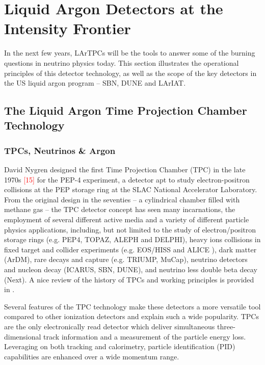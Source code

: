 \chapter{Liquid Argon Detectors at the Intensity Frontier}\label{ch:2}
In the next few years, LArTPCs will  be the tools to answer some of the burning questions in neutrino physics today.  This section illustrates the operational principles of this detector technology, as well as the scope of the key detectors in the US liquid argon program -- SBN, DUNE and LArIAT.


\section{The Liquid Argon Time Projection Chamber Technology}

\subsection{TPCs, Neutrinos \& Argon}
David Nygren designed the first Time Projection Chamber (TPC) in the late 1970s \textcolor{red}{[15]} for the  PEP-4 experiment, a detector  apt to study electron-positron collisions at the PEP storage ring at the SLAC National Accelerator Laboratory.
From the original design  in the seventies -- a cylindrical chamber filled with methane gas -- the TPC detector concept has seen many incarnations, the employment of several different active media and a variety of different particle physics applications, including, but not limited to the study of electron/positron storage rings (e.g. PEP4, TOPAZ, ALEPH and DELPHI), heavy ions collisions in fixed target and collider experiments (e.g. EOS/HISS and ALICE ), dark matter (ArDM), rare decays and capture (e.g. TRIUMP, MuCap),  neutrino detectors and nucleon decay (ICARUS, SBN, DUNE), and neutrino less double beta decay (Next). A nice review of the history of TPCs and working principles is provided in \cite{0034-4885-73-11-116201}.

Several features of the TPC technology make these detectors a more versatile tool compared to other ionization detectors and explain such a wide popularity. TPCs are the only electronically read detector which deliver simultaneous  three-dimensional track information and a measurement of the particle energy loss. Leveraging on both tracking and calorimetry,  particle identification (PID) capabilities are enhanced  over a wide momentum range.

